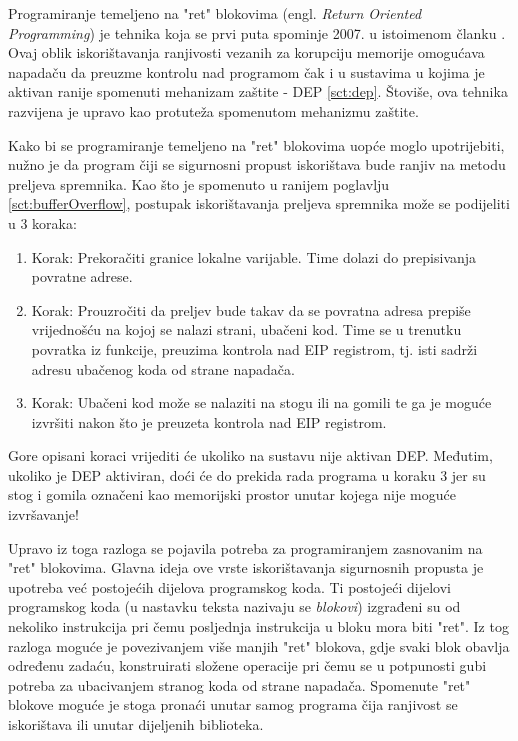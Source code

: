 \documentclass[times, utf8, diplomski, numeric]{fer}
\begin{document}
Programiranje temeljeno na "ret" blokovima (engl. \emph{Return
Oriented Programming}) je tehnika koja se prvi puta spominje
2007. u istoimenom članku \citep{rop_official}. Ovaj oblik
iskorištavanja ranjivosti vezanih za korupciju memorije omogućava
napadaču da preuzme kontrolu nad programom čak i u sustavima u
kojima je aktivan ranije spomenuti mehanizam zaštite - DEP 
\ref{sct:dep}. Štoviše, ova tehnika razvijena je upravo kao
protuteža spomenutom mehanizmu zaštite.

Kako bi se programiranje temeljeno na "ret" blokovima uopće moglo
upotrijebiti, nužno je da program čiji se sigurnosni propust
iskorištava bude ranjiv na metodu preljeva spremnika. Kao što je
spomenuto u ranijem poglavlju \ref{sct:bufferOverflow}, postupak
iskorištavanja preljeva spremnika može se podijeliti u 3 koraka:

\begin{enumerate}
\item Korak: Prekoračiti granice lokalne varijable. Time dolazi
do prepisivanja povratne adrese.
\item Korak: Prouzročiti da preljev bude takav da se povratna
adresa prepiše vrijednošću na kojoj se nalazi strani, ubačeni
kod. Time se u trenutku povratka iz funkcije, preuzima kontrola
nad EIP registrom, tj. isti sadrži adresu ubačenog koda od strane
napadača.
\item Korak: Ubačeni kod može se nalaziti na stogu ili na gomili
te ga je moguće izvršiti nakon što je preuzeta kontrola nad EIP
registrom.
\end{enumerate}

Gore opisani koraci vrijediti će ukoliko na sustavu nije aktivan
DEP. Međutim, ukoliko je DEP aktiviran, doći će do prekida rada
programa u koraku 3 jer su stog i gomila označeni kao memorijski
prostor unutar kojega nije moguće izvršavanje!

Upravo iz toga razloga se pojavila potreba za programiranjem
zasnovanim na "ret" blokovima. Glavna ideja ove vrste
iskorištavanja sigurnosnih propusta je upotreba već postojećih
dijelova programskog koda. Ti postojeći dijelovi programskog koda
(u nastavku teksta nazivaju se \emph{blokovi}) izgrađeni su od
nekoliko instrukcija pri čemu posljednja instrukcija u bloku mora
biti "ret". Iz tog razloga moguće je povezivanjem više manjih
"ret" blokova, gdje svaki blok obavlja određenu zadaću,
konstruirati složene operacije pri čemu se u potpunosti gubi
potreba za ubacivanjem stranog koda od strane napadača. Spomenute
"ret" blokove moguće je stoga pronaći unutar samog programa čija
ranjivost se iskorištava ili unutar dijeljenih biblioteka.
\end{document}
